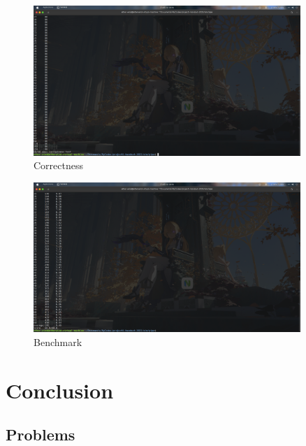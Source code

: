 \documentclass{article}
\begin{document}
\begin{figure}[htbp] %
\centering %
\includegraphics[width=0.9\textwidth]{figure/PartC1.png} %
\caption{Correctness} %
\label{fig:correctness} %
\end{figure}

\begin{figure}[htbp] %
\centering %
\includegraphics[width=0.9\textwidth]{figure/PartC2.png} %
\caption{Benchmark} %
\label{fig:benchmark} %
\end{figure}

\section{Conclusion}

\subsection{Problems}
\end{document}
